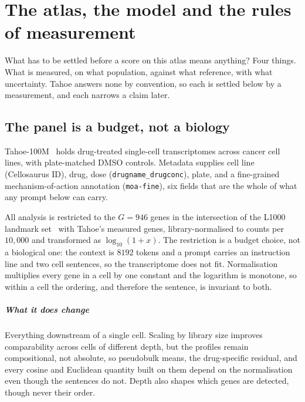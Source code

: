 
\chapter{The atlas, the model and the rules of measurement}
\label{sec:methods-data}

\begin{question}
What has to be settled before a score on this atlas means anything? Four
things. What is measured, on what population, against what reference, with what
uncertainty. Tahoe answers none by convention, so each is settled below by a
measurement, and each narrows a claim later.
\end{question}

\section{The panel is a budget, not a biology}

Tahoe-100M~\cite{tahoe100m} holds drug-treated single-cell transcriptomes across
cancer cell lines, with plate-matched DMSO controls. Metadata supplies cell line
(Cellosaurus ID), drug, dose (\texttt{drugname\_drugconc}), plate, and a
fine-grained mechanism-of-action annotation (\texttt{moa-fine}), six fields that
are the whole of what any prompt below can carry.

All analysis is restricted to the $G = 946$ genes in the intersection of the
L1000 landmark set~\cite{l1000} with Tahoe's measured genes, library-normalised
to counts per $10{,}000$ and transformed as $\log_{10}(1 + x)$. The restriction
is a budget choice, not a biological one: the context is $8192$ tokens and a
prompt carries an instruction line and two cell sentences, so the transcriptome
does not fit. Normalisation multiplies every gene in a cell by one constant and
the logarithm is monotone, so within a cell the ordering, and therefore the
sentence, is invariant to both.

\paragraph{What it does change} Everything downstream of a single cell. Scaling
by library size improves comparability across cells of different depth,
but the profiles remain compositional, not absolute, so pseudobulk means, the
drug-specific residual, and every cosine and Euclidean quantity built on them
depend on the normalisation even though the sentences do not. Depth also shapes
which genes are detected, though never their order.


